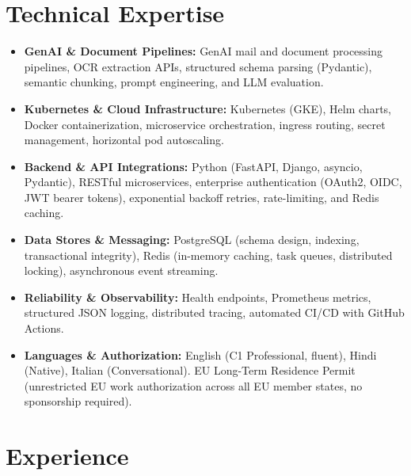 \documentclass[10pt,a4paper]{article}
\begin{document}
\section{Technical Expertise}
\begin{itemize}
  \item \textbf{GenAI \& Document Pipelines:} GenAI mail and document processing pipelines, OCR extraction APIs, structured schema parsing (Pydantic), semantic chunking, prompt engineering, and LLM evaluation.
  \item \textbf{Kubernetes \& Cloud Infrastructure:} Kubernetes (GKE), Helm charts, Docker containerization, microservice orchestration, ingress routing, secret management, horizontal pod autoscaling.
  \item \textbf{Backend \& API Integrations:} Python (FastAPI, Django, asyncio, Pydantic), RESTful microservices, enterprise authentication (OAuth2, OIDC, JWT bearer tokens), exponential backoff retries, rate-limiting, and Redis caching.
  \item \textbf{Data Stores \& Messaging:} PostgreSQL (schema design, indexing, transactional integrity), Redis (in-memory caching, task queues, distributed locking), asynchronous event streaming.
  \item \textbf{Reliability \& Observability:} Health endpoints, Prometheus metrics, structured JSON logging, distributed tracing, automated CI/CD with GitHub Actions.
  \item \textbf{Languages \& Authorization:} English (C1 Professional, fluent), Hindi (Native), Italian (Conversational). EU Long-Term Residence Permit (unrestricted EU work authorization across all EU member states, no sponsorship required).
\end{itemize}

\section{Experience}
\end{document}
